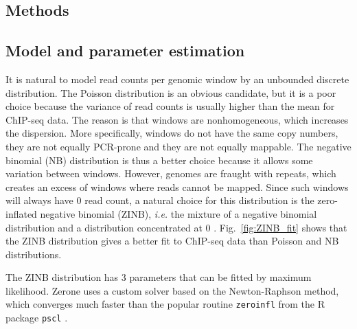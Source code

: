 \documentclass{bioinfo}
\begin{document}
\begin{methods}
\section{Methods}

\subsection{Model and parameter estimation}
\label{sub:hmm}
It is natural to model read counts per genomic window by an unbounded
discrete distribution. The Poisson distribution is an obvious candidate,
but it is a poor choice because the variance of read counts is usually
higher than the mean for ChIP-seq data. The reason is that windows
are nonhomogeneous, which increases the dispersion. More specifically,
windows do not have the same copy numbers, they are not equally PCR-prone
and they are not equally mappable.
The negative binomial (NB) distribution is thus a better choice
because it allows some variation between windows. However, genomes
are fraught with repeats, which creates an excess of windows where
reads cannot be mapped. Since such windows will always have 0 read
count, a natural choice for this distribution is the zero-inflated
negative binomial (ZINB), \textit{i.e.} the mixture of a negative
binomial distribution and a distribution concentrated at 0
\citep{pmid21787385}.
Fig.~\ref{fig:ZINB_fit} shows that the
ZINB distribution gives a better fit to ChIP-seq data than Poisson
and NB distributions.

The ZINB distribution has 3 parameters that can be fitted by maximum
likelihood. Zerone uses a custom solver based on the Newton-Raphson
method, which converges much faster than the popular routine
\texttt{zeroinfl} \citep{psclb} from the R package
\texttt{pscl} \citep{pscla}.


\end{methods}
\end{document}

